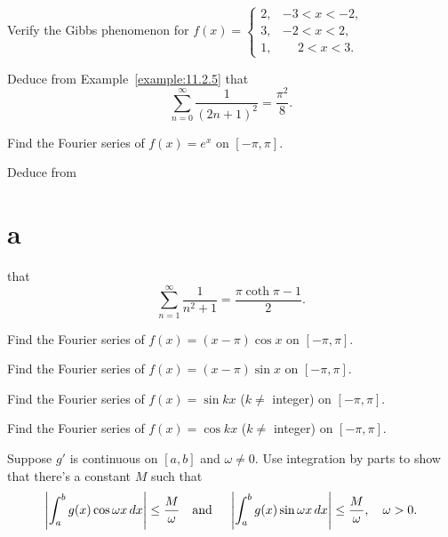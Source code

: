 \begin{exerciselist}
  \item\label{exer:11.2.18} \Lex Verify the Gibbs phenomenon for \quad $f(x)= \left\{
  \begin{array}{rl}
    2, & -3<x< -2,         \\
    3, & -2<x<2,           \\
    1, & \phantom{-}2<x<3.
  \end{array}\right.$

  \item\label{exer:11.2.19} Deduce from Example~\ref{example:11.2.5} that
  \[
    \sum_{n=0}^{\infty}\frac{1}{(2n+1)^{2}}=\frac{\pi^{2}}{8}.
  \]

  \item\label{exer:11.2.20}
  \begin{alist}
    \item %
    Find the Fourier series of $f(x)=e^{x}$ on $[-\pi,\pi]$.

    \item %
    Deduce from \part{a} that
    \[
      \sum_{n=1}^{\infty}\frac{1}{n^{2}+1}=\frac{\pi\coth\pi-1}{2}.
    \]
  \end{alist}

  \item\label{exer:11.2.21} Find the Fourier series of $f(x)=(x-\pi)\cos x$ on $[-\pi,\pi]$.

  \item\label{exer:11.2.22} Find the Fourier series of $f(x)=(x-\pi)\sin x$ on $[-\pi,\pi]$.

  \item\label{exer:11.2.23} Find the Fourier series of $f(x)=\sin kx$ ($k\ne$ integer) on
        $[-\pi,\pi]$.

  \item\label{exer:11.2.24} Find the Fourier series of $f(x)=\cos kx$ ($k\ne$ integer) on
        $[-\pi,\pi]$.

  \item\label{exer:11.2.25}
  \begin{alist}
    \item %
    Suppose $g'$ is continuous on $[a,b]$ and $\omega\ne0$. Use integration by parts to show that
    there's a constant $M$ such that
    \[
      \left|\int_{a}^{b}g(x)\cos\omega x\,dx\right|\le\frac{M}{\omega}\mbox{\quad and \quad}\left|\int_{a}^{b}g(x)\sin\omega x\,dx\right|\le\frac{M}{\omega},\quad \omega>0.
    \]


\end{alist}
\end{exerciselist}
